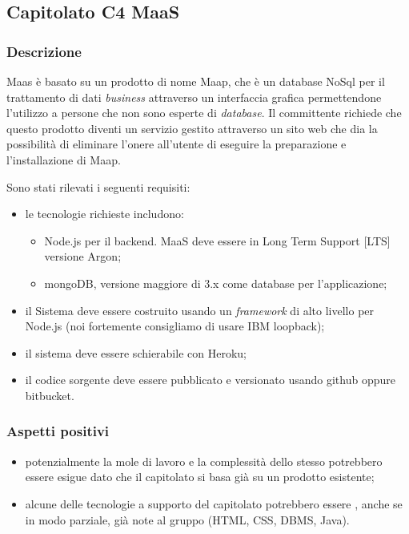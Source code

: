 \documentclass[12pt,a4paper]{article}
\begin{document}
\newpage
\subsection{Capitolato C4 MaaS}
\subsubsection{Descrizione}
Maas è basato su un prodotto di nome Maap, che è un database NoSql per il trattamento di dati \textit{business} attraverso un interfaccia grafica permettendone l'utilizzo a persone che non sono esperte di \textit{database}. Il committente richiede che questo prodotto diventi un servizio gestito attraverso un sito web che dia la possibilità di eliminare l'onere all'utente di eseguire la preparazione e l'installazione di Maap.

Sono stati rilevati i seguenti requisiti:

\begin{itemize}

\item le tecnologie richieste includono:

\begin{itemize}
\item Node.js per il backend. MaaS deve essere in Long Term Support [LTS] versione Argon;
\item mongoDB, versione maggiore di 3.x come database per l'applicazione; 
\end{itemize}

\item il Sistema deve essere costruito usando un \textit{framework} di alto livello per Node.js (noi fortemente consigliamo di usare IBM loopback);

\item il sistema deve essere schierabile con Heroku;
 
\item il codice sorgente deve essere pubblicato e versionato usando github oppure bitbucket. 

\end{itemize}

\subsubsection{Aspetti positivi}
\begin{itemize}
\item potenzialmente la mole di lavoro e la complessità dello stesso potrebbero essere esigue dato che il capitolato si basa già su un prodotto esistente;

\item alcune delle tecnologie a supporto del capitolato potrebbero essere , anche se in modo parziale, già note al gruppo (HTML, CSS, DBMS, Java).
\end{itemize}
\end{document}
